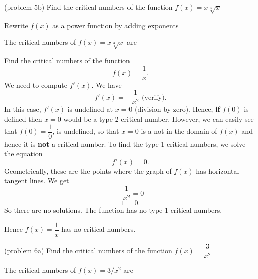 \documentclass{ximera}
\begin{document}
\begin{problem}(problem 5b)
  Find the critical numbers of the function $f(x) = x\sqrt[3]x$
  
    \begin{hint}
      Rewrite $f(x)$ as a power function by adding exponents
    \end{hint}
    
    
		The critical numbers of $f(x) = x\sqrt[3]x$ are
		\begin{multipleChoice}
		\end{multipleChoice} 
\end{problem}



\begin{example}[example 6]  Find the critical numbers of the function 
\[f(x) = \dfrac{1}{x}.\]
We need to compute $f'(x)$.  We have
\[f'(x) = -\frac{1}{ x^2} \mbox{   (verify)}.\]
In this case, $f'(x)$ is undefined at $x = 0$ (division by zero). Hence,  {\bf if}
$f(0)$ is defined then $x=0$ would be a type 2 critical number.  However, we can easily see that $f(0) = \dfrac{1}{0}$, is undefined,  so 
that $x=0$ is a not in the domain of $f(x)$ and hence it is {\bf not} a critical number.
To find the type 1 critical numbers, we solve the equation
\[f'(x) = 0.\]
Geometrically, these are the points where the graph of $f(x)$ has horizontal tangent lines.
We get
\[ -\frac{1}{ x^2}  =0\]
\[ 1 =0.\]
So there are no solutions.  The function has no type 1 critical numbers.


Hence $f(x) = \dfrac{1}{x}$ has no critical numbers. 

\begin{image}
\end{image}


\end{example}


\begin{problem}(problem 6a)
  Find the critical numbers of the function $f(x) = \dfrac{3}{x^2}$
  
  
    
    
    
		The critical numbers of $f(x) = 3/x^2$ are
		\begin{multipleChoice}
		\choice{$x = 0$}
		\choice{$x = 1/6$}
		\choice[correct]{no critical numbers}
		\end{multipleChoice} 
\end{problem}
\end{document}
